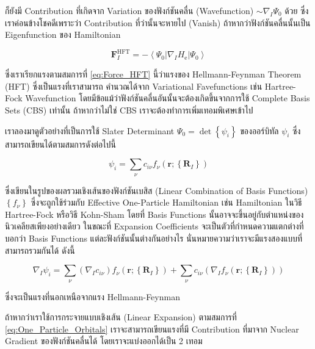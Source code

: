 \noindent ก็ยังมี Contribution ที่เกิดจาก Variation ของฟังก์ชันคลื่น (Wavefunction) $\sim \nabla_I \Psi_0$ ด้วย
ซึ่งเราค่อนข้างโชคดีเพราะว่า Contribution ที่ว่านั้นจะหายไป (Vanish) ถ้าหากว่าฟังก์ชันคลื่นนั้นเป็น Eigenfunction ของ Hamiltonian

\begin{equation}
  \label{eq:Force_HFT}
  \mathbf{F}_I^{\mathrm{HFT}}
  =
  -\left\langle\Psi_0\left|\nabla_I  H_{\mathrm{e}}\right| \Psi_0\right\rangle
\end{equation}

\noindent ซึ่งเราเรียกแรงตามสมการที่ \eqref{eq:Force_HFT} นี้ว่าแรงของ Hellmann-Feynman Theorem (HFT) ซึ่งเป็นแรงที่เราสามารถ%
คำนวณได้จาก Variational Favefunctions เช่น Hartree-Fock Wavefunction โดยมีข้อแม้ว่าฟังก์ชันคลื่นอันนั้นจะต้องเกิดขึ้นจากการใช้
Complete Basis Sets (CBS) เท่านั้น ถ้าหากว่าไม่ใช่ CBS เราจะต้องทำการเพิ่มเทอมพิเศษเข้าไป

เราลองมาดูตัวอย่างที่เป็นการใช้ Slater Determinant $\Psi_0=\operatorname{det}\left\{\psi_i\right\}$ ของออร์บิทัล $\psi_i$
ซึ่งสามารถเขียนได้ตามสมการดังต่อไปนี้

\begin{equation}
  \label{eq:One_Particle_Orbitals}
  \psi_i
  =
  \sum_\nu c_{i \nu} f_\nu\left(\mathbf{r} ;\left\{\mathbf{R}_I\right\}\right)
\end{equation}

\noindent ซึ่งเขียนในรูปของผลรวมเชิงเส้นของฟังก์ชันเบสิส (Linear Combination of Basis Functions) $\left\{f_\nu\right\}$
ซึ่งจะถูกใช้ร่วมกับ Effective One-Particle Hamiltonian เช่น Hamiltonian ในวิธี Hartree-Fock หรือวิธี Kohn-Sham โดยที่ Basis
Functions นั้นอาจจะขึ้นอยู่กับตำแหน่งของนิวเคลียสเพียงอย่างเดียว ในขณะที่ Expansion Coefficients จะเป็นตัวที่กำหนดความแตกต่างที่บอกว่า
Basis Functions แต่ละฟังก์ชันนั้นต่างกันอย่างไร นั่นหมายความว่าเราจะมีแรงสองแบบที่สามารถรวมกันได้ ดังนี้

\begin{equation}
  \nabla_I \psi_i
  =
  \sum_\nu\left(\nabla_I c_{i \nu}\right) f_\nu\left(\mathbf{r} ;\left\{\mathbf{R}_I\right\}\right)
  + \sum_\nu c_{i \nu}\left(\nabla_I f_\nu\left(\mathbf{r} ;\left\{\mathbf{R}_I\right\}\right)\right)
\end{equation}

\noindent ซึ่งจะเป็นแรงที่นอกเหนือจากแรง Hellmann-Feynman

ถ้าหากว่าเราใช้การกระจายแบบเชิงเส้น (Linear Expansion) ตามสมการที่ \eqref{eq:One_Particle_Orbitals} เราจะสามารถเขียนแรงที่มี
Contribution ที่มาจาก Nuclear Gradient ของฟังก์ชันคลื่นได้ โดยเราจะแบ่งออกได้เป็น 2 เทอม

